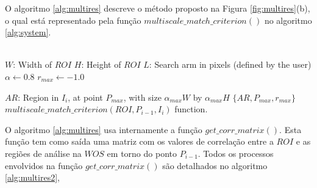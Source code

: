 O algoritmo \ref{alg:multires} descreve o método proposto na Figura \ref{fig:multires}(b), o qual
está representado pela função $multiscale\_match\_criterion()$ no algoritmo \ref{alg:system}.
\begin{algorithm}
 ~\\
 $W$: Width of $ROI$\;
 $H$: Height of $ROI$\;
 $L$: Search arm in pixels (defined by the user)\;
 $\alpha \leftarrow 0.8$\;
 $r_{max} \leftarrow -1.0$\;
 ~\\
    
$AR$: Region in $I_i$, at point $P_{max}$, with size $\alpha_{max} W$ by $\alpha_{max} H$\;      
\Return $\{AR,P_{max},r_{max}\}$\;
~\\
\caption{$multiscale\_match\_criterion(ROI,P_{i-1},I_i)$ function.}
\label{alg:multires}
\end{algorithm}
O algoritmo \ref{alg:multires} usa internamente a função $get\_corr\_matrix()$.
Esta função tem como saída uma matriz com os valores de correlação entre a $ROI$ e as regiões de análise na $WOS$
em torno do ponto $P_{i-1}$. Todos os processos envolvidos na função $get\_corr\_matrix()$ são detalhados no algoritmo
\ref{alg:multires2},
